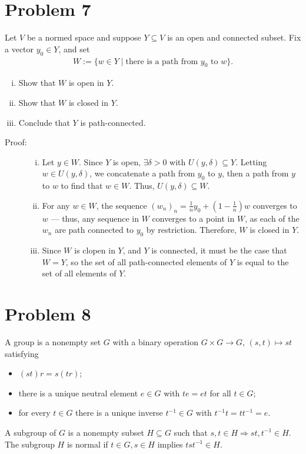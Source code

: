 \documentclass[10pt]{extarticle}
\begin{document}
  \section{Problem 7}%
  Let $V$ be a normed space and suppose $Y\subseteq V$ is an open and connected subset. Fix a vector $y_0\in Y$, and set
  \begin{align*}
    W := \{w\in Y\mid \text{there is a path from $y_0$ to $w$}\}.
  \end{align*}
  \begin{enumerate}[(i)]
    \item Show that $W$ is open in $Y$.
    \item Show that $W$ is closed in $Y$.
    \item Conclude that $Y$ is path-connected.
  \end{enumerate}
  \begin{description}
    \item[Proof:]\hfill
      \begin{enumerate}[(i)]
        \item Let $y\in W$. Since $Y$ is open, $\exists \delta > 0$ with $U(y,\delta)\subseteq Y$. Letting $w\in U(y,\delta)$, we concatenate a path from $y_0$ to $y$, then a path from $y$ to $w$ to find that $w\in W$. Thus, $U(y,\delta)\subseteq W$.
        \item For any $w\in W$, the sequence $\displaystyle(w_n)_n = \frac{1}{n}y_0 + \left(1-\frac{1}{n}\right)w$ converges to $w$ --- thus, any sequence in $W$ converges to a point in $W$, as each of the $w_n$ are path connected to $y_0$ by restriction. Therefore, $W$ is closed in $Y$.
        \item Since $W$ is clopen in $Y$, and $Y$ is connected, it must be the case that $W = Y$, so the set of all path-connected elements of $Y$ is equal to the set of all elements of $Y$.
      \end{enumerate}
  \end{description}
  \section{Problem 8}%
  A group is a nonempty set $G$ with a binary operation $G\times G \rightarrow G$, $(s,t)\mapsto st$ satisfying
  \begin{itemize}
    \item $(st)r = s(tr)$;
    \item there is a unique neutral element $e\in G$ with $te = et$ for all $t\in G$;
    \item for every $t\in G$ there is a unique inverse $t^{-1}\in G$ with $t^{-1}t = tt^{-1} = e$.
  \end{itemize}
  A subgroup of $G$ is a nonempty subset $H\subseteq G$ such that $s,t\in H \Rightarrow st,t^{-1}\in H$. The subgroup $H$ is normal if $t\in G,s\in H$ implies $tst^{-1}\in H$.\\
\end{document}

